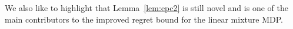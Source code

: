 


We also like to highlight that Lemma~\ref{lem:epc2} is still novel and is one of the main contributors to the improved regret bound for the linear mixture MDP.